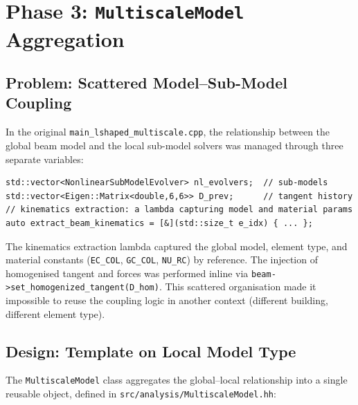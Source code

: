 \section{Phase 3: \texttt{MultiscaleModel} Aggregation}
\label{sec:refactor-multiscale-model}

\subsection{Problem: Scattered Model--Sub-Model Coupling}

In the original \texttt{main\_lshaped\_multiscale.cpp}, the
relationship between the global beam model and the local sub-model
solvers was managed through three separate variables:

\begin{lstlisting}[caption={Scattered state in original main.}]
std::vector<NonlinearSubModelEvolver> nl_evolvers;  // sub-models
std::vector<Eigen::Matrix<double,6,6>> D_prev;      // tangent history
// kinematics extraction: a lambda capturing model and material params
auto extract_beam_kinematics = [&](std::size_t e_idx) { ... };
\end{lstlisting}

The kinematics extraction lambda captured the global model, element
type, and material constants (\texttt{EC\_COL}, \texttt{GC\_COL},
\texttt{NU\_RC}) by reference.  The injection of homogenised
tangent and forces was performed inline via
\texttt{beam->set\_homogenized\_tangent(D\_hom)}.  This scattered
organisation made it impossible to reuse the coupling logic in
another context (different building, different element type).

\subsection{Design: Template on Local Model Type}
\label{sec:refactor-model-design}

The \texttt{MultiscaleModel} class aggregates the global--local
relationship into a single reusable object, defined in
\texttt{src/analysis/MultiscaleModel.hh}:

